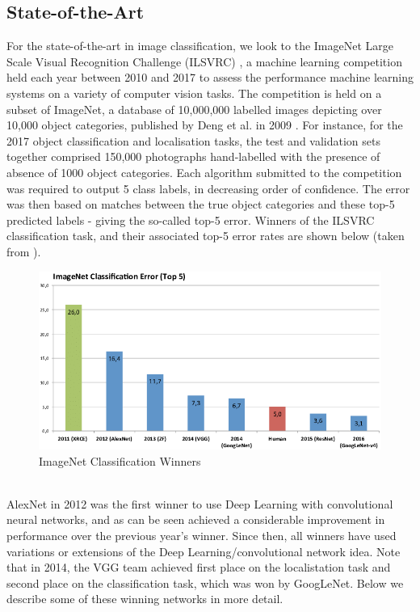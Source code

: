 \documentclass[11pt]{article} %
\theoremstyle{plain}
\theoremstyle{definition}
\begin{document}
\subsection{State-of-the-Art}
For the state-of-the-art in image classification, we look to the ImageNet Large Scale Visual Recognition Challenge (ILSVRC) \cite{ILSVRC}, a machine learning competition held each year between 2010 and 2017 to assess the performance machine learning systems on a variety of computer vision tasks. The competition is held on a subset of ImageNet, a database of 10,000,000 labelled images depicting over 10,000 object categories, published by Deng et al. in 2009 \cite{imagenet}. For instance, for the 2017 object classification and localisation tasks, the test and validation sets together comprised 150,000 photographs hand-labelled with the presence of absence of 1000 object categories. Each algorithm submitted to the competition was required to output 5 class labels, in decreasing order of confidence. The error was then based on matches between the true object categories and these top-5 predicted labels - giving the so-called top-5 error. Winners of the ILSVRC classification task, and their associated top-5 error rates are shown below (taken from \cite{ILSVRC_Classification_Top5}).          
\begin{figure}[!ht]
  \centering    
  \caption{ImageNet Classification Winners}
  \label{fig:ILSVRC_Winners}
  \includegraphics[scale=0.4]{ILSVRC_Winners.png}
\end{figure}
\\
\noindent
AlexNet in 2012 was the first winner to use Deep Learning with convolutional neural networks, and as can be seen achieved a considerable improvement in performance over the previous year's winner. Since then, all winners have used variations or extensions of the Deep Learning/convolutional network idea. Note that in 2014, the VGG team achieved first place on the localistation task and second place on the classification task, which was won by GoogLeNet. Below we describe some of these winning networks in more detail.
\\
\\
\noindent
\end{document}
